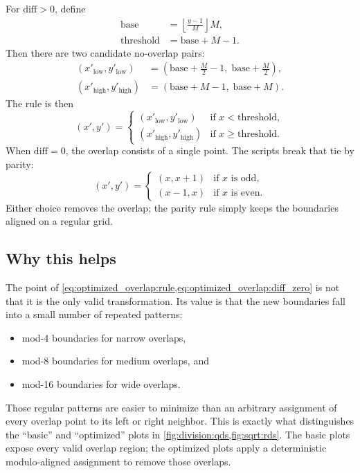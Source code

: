 \documentclass[11pt]{article}
\numberwithin{equation}{section}
\begin{document}
For $\text{diff}>0$, define
\begin{align}
  \label{eq:optimized_overlap:base}
  \text{base} &= \left\lfloor \frac{y-1}{M} \right\rfloor M, \\
  \label{eq:optimized_overlap:threshold}
  \text{threshold} &= \text{base} + M - 1.
\end{align}
Then there are two candidate no-overlap pairs:
\begin{align}
  \label{eq:optimized_overlap:low_pair}
  (x'_{\text{low}},y'_{\text{low}}) &= \left(\text{base}+\frac{M}{2}-1,\; \text{base}+\frac{M}{2}\right), \\
  \label{eq:optimized_overlap:high_pair}
  (x'_{\text{high}},y'_{\text{high}}) &= \left(\text{base}+M-1,\; \text{base}+M\right).
\end{align}
The rule is then
\begin{equation}
  \label{eq:optimized_overlap:rule}
  (x',y') =
  \begin{cases}
    (x'_{\text{low}},y'_{\text{low}}) & \text{if } x < \text{threshold}, \\
    (x'_{\text{high}},y'_{\text{high}}) & \text{if } x \ge \text{threshold}.
  \end{cases}
\end{equation}
When $\text{diff}=0$, the overlap consists of a single point.
The scripts break that tie by parity:
\begin{equation}
  \label{eq:optimized_overlap:diff_zero}
  (x',y') =
  \begin{cases}
    (x,x+1) & \text{if } x \text{ is odd}, \\
    (x-1,x) & \text{if } x \text{ is even}.
  \end{cases}
\end{equation}
Either choice removes the overlap; the parity rule simply keeps the boundaries aligned on a regular
grid.

\subsection{Why this helps}
\label{ssec:optimized_overlap:why}

The point of \cref{eq:optimized_overlap:rule,eq:optimized_overlap:diff_zero} is not that it is the
only valid transformation.
Its value is that the new boundaries fall into a small number of repeated patterns:
\begin{itemize}
  \item mod-4 boundaries for narrow overlaps,
  \item mod-8 boundaries for medium overlaps, and
  \item mod-16 boundaries for wide overlaps.
\end{itemize}
Those regular patterns are easier to minimize than an arbitrary assignment of every overlap point to
its left or right neighbor.
This is exactly what distinguishes the ``basic'' and ``optimized'' plots in
\cref{fig:division:qds,fig:sqrt:rds}.
The basic plots expose every valid overlap region; the optimized plots apply a deterministic
modulo-aligned assignment to remove those overlaps.
\end{document}
